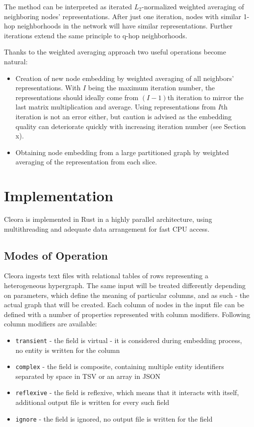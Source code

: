 \documentclass{IEEEtran}
\begin{document}
The method can be interpreted as iterated $L_2$-normalized weighted averaging of neighboring nodes' representations. After just one iteration, nodes with similar 1-hop neighborhoods in the network will have similar representations. Further iterations extend the same principle to q-hop neighborhoods. 

Thanks to the weighted averaging approach two useful operations become natural: 
\begin{itemize}
    \item Creation of new node embedding by weighted averaging of all neighbors' representations. With $I$ being the maximum iteration number, the representations should ideally come from $(I-1)$th iteration to mirror the last matrix multiplication and average. Using representations from $I$th iteration is not an error either, but caution is advised as the embedding quality can deteriorate quickly with increasing iteration number (see Section x).
    \item Obtaining node embedding from a large partitioned graph by weighted averaging of the representation from each slice.
\end{itemize}
 
 
\section{Implementation}

Cleora is implemented in Rust in a highly parallel architecture, using multithreading and adequate data arrangement for fast CPU access. 

\subsection{Modes of Operation}

Cleora ingests text files with relational tables of rows representing a heterogeneous hypergraph. The same input will be treated differently depending on parameters, which define the meaning of particular columns, and as such - the actual graph that will be created. Each column of nodes in the input file can be defined with a number of properties represented with column modifiers. Following column modifiers are available:
\begin{itemize}
    \item \texttt{transient} - the field is virtual - it is considered during embedding process, no entity is written for the column
    \item \texttt{complex} - the field is composite, containing multiple entity identifiers separated by space in TSV or an array in JSON
    \item \texttt{reflexive} - the field is reflexive, which means that it interacts with itself, additional output file is written for every such field
    \item \texttt{ignore} - the field is ignored, no output file is written for the field
\end{itemize}
\end{document}
